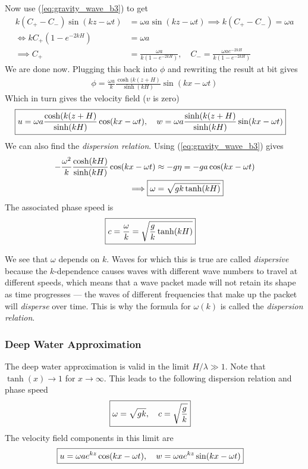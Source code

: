 \documentclass[a4paper, 12pt]{article}
\numberwithin{equation}{subsubsection}
\begin{document}
Now use (\ref{eq:gravity_wave_b3}) to get
\begin{align*}
	k(C_+ - C_-)\sin(kz - \omega t) &= \omega a \sin(kz - \omega t) \implies k(C_+ - C_-) = \omega a \\
	\Leftrightarrow k C_+ (1 - e^{-2kH}) &= \omega a \\
	\implies C_+ &= \frac{\omega a}{k (1 - e^{-2kH})}, \quad C_- = \frac{\omega a e^{-2kH}}{k (1 - e^{-2kH})}
\end{align*}
We are done now. Plugging this back into $\phi$ and rewriting the result at bit gives
\begin{align}
	\phi = \frac{\omega a}{k} \frac{\cosh(k(z + H)}{\sinh(kH)} \sin(k x - \omega t)
\end{align}
Which in turn gives the velocity field ($v$ is zero)
\begin{align}
	\Aboxed{u = \omega a \frac{\cosh(k(z + H)}{\sinh(kH)} \cos(k x - \omega t), \quad w =\omega a \frac{\sinh(k(z + H)}{\sinh(kH)} \sin(k x - \omega t)}
\end{align}
We can also find the \textit{dispersion relation}. Using (\ref{eq:gravity_wave_b3}) gives
\begin{align}
	- \frac{\omega^2}{k} \frac{\cosh(kH)}{\sinh(kH)} 	\cos(kx - \omega t) &\approx - g \eta = - g a \cos(k x - \omega t) \\
	\implies \Aboxed{\omega &= \sqrt{g k \tanh(kH)}}
\end{align}
The associated phase speed is
\begin{align}
	\Aboxed{c = \frac{\omega}{k} = \sqrt{\frac{g}{k} \tanh(kH)}}
\end{align}

We see that $\omega$ depends on $k$. Waves for which this is true are called \textit{dispersive} because the $k$-dependence causes waves with different wave numbers to travel at different speeds, which means that a wave packet made will not retain its shape as time progresses --- the waves of different frequencies that make up the packet will \textit{disperse} over time. This is why the formula for $\omega(k)$ is called the \textit{dispersion relation}.


\subsubsection{Deep Water Approximation}
The deep water approximation is valid in the limit $H/\lambda \gg 1$. Note that $\tanh(x) \rightarrow 1$ for $x \rightarrow \infty$. This leads to the following dispersion relation and phase speed
\begin{align}
	\Aboxed{\omega = \sqrt{g k}, \quad c = \sqrt{\frac{g}{k}}}
\end{align}
The velocity field components in this limit are
\begin{align}
	\Aboxed{u = \omega a e^{kz} \cos(kx - \omega t), \quad w = \omega a e^{kz} \sin(kx - \omega t)}
\end{align}
\end{document}
